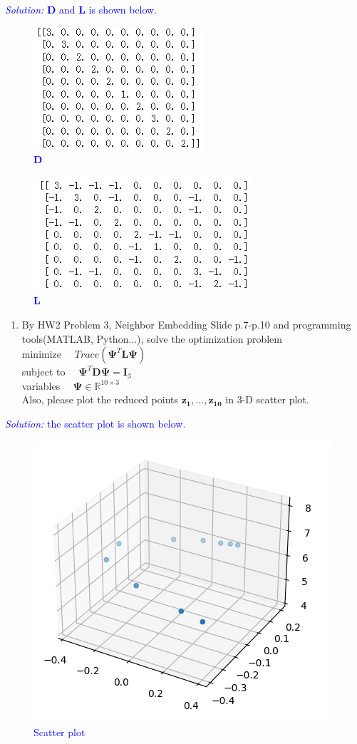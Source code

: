 \documentclass{article}
\def\solColor{blue}
\begin{document}
\textcolor{\solColor}{\textit{Solution:}
$\boldsymbol{D}$ and $\boldsymbol{L}$ is shown below.
	\begin{figure}[H]
	\centerline{\includegraphics[width = 5 cm, height = 5 cm]{sol 2-2 D.png}}
	\label{fig:sol 2-2 D}
  \caption{
	$\boldsymbol{D}$
	}
	\end{figure}
	\begin{figure}[H]
	\centerline{\includegraphics[width = 5 cm, height = 5 cm]{sol 2-2 L.png}}
	\label{fig:sol 2-2 L}
  \caption{
	$\boldsymbol{L}$
	}
	\end{figure}
}

\begin{enumerate}[resume]
    \item By HW2 Problem 3, Neighbor Embedding Slide p.7-p.10 and programming tools(MATLAB, Python...), solve the optimization problem \\
minimize  $\quad Trace(\boldsymbol{\Psi}^T \boldsymbol{L} \boldsymbol{\Psi})$ \\ 
subject to $\quad \boldsymbol{\Psi}^T \boldsymbol{D} \boldsymbol{\Psi} = \boldsymbol{I}_3$ \\
variables $\quad \boldsymbol{\Psi} \in \mathbb{R}^{10 \times 3}$ \\
Also, please plot the reduced points $\boldsymbol{z_1},...,\boldsymbol{z_{10}}$ in 3-D scatter plot.
\end{enumerate}

\textcolor{\solColor}{\textit{Solution:}
the scatter plot is shown below.
	\begin{figure}[H]
	\centerline{\includegraphics[width = 5 cm, height = 5 cm]{sol 2-3.png}}
	\label{fig:sol 2-3}
  \caption{
	Scatter plot
	}
	\end{figure}
}
\end{document}
